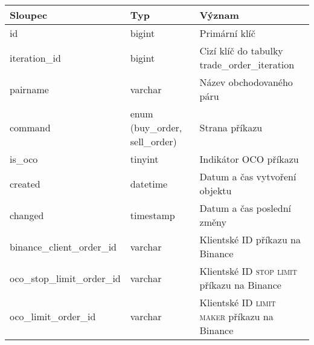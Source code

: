 \begin{center}
    \begin{longtable}[t]{|l|C{4cm}|p{4cm}|}
        \hline
        Sloupec                     & Typ                                                                                  & Význam                                               \\
        \hline
        id                          & bigint                                                                               & Primární klíč                                        \\
        iteration\_id               & bigint                                                                               & Cizí klíč do tabulky trade\_order\_iteration         \\
        pairname                    & varchar                                                                              & Název obchodovaného páru                             \\
        command                     & enum (buy\_order, sell\_order)                                                       & Strana příkazu                                       \\
        is\_oco                     & tinyint                                                                              & Indikátor OCO příkazu                                \\
        created                     & datetime                                                                             & Datum a čas vytvoření objektu                        \\
        changed                     & timestamp                                                                            & Datum a čas poslední změny                           \\
        binance\_client\_order\_id  & varchar                                                                              & Klientské ID příkazu na Binance                      \\
        oco\_stop\_limit\_order\_id & varchar                                                                              & Klientské ID \textsc{stop limit} příkazu na Binance  \\
        oco\_limit\_order\_id       & varchar                                                                              & Klientské ID \textsc{limit maker} příkazu na Binance \\

\end{longtable}
\end{center}

